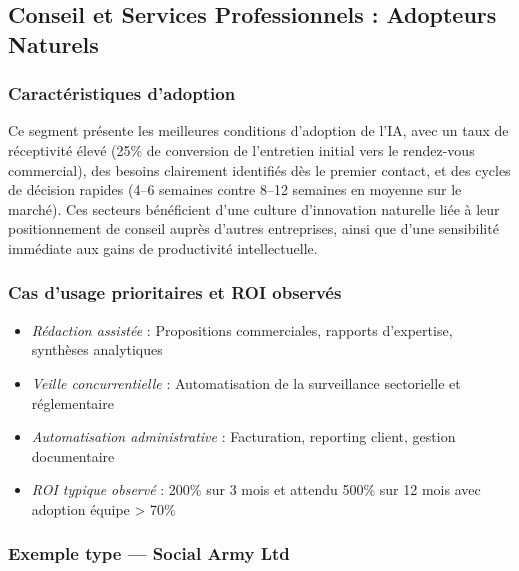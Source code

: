 \subsection{Conseil et Services Professionnels : Adopteurs Naturels}

\subsubsection{Caractéristiques d'adoption}
Ce segment présente les meilleures conditions d'adoption de l'IA, avec un taux de réceptivité élevé (25\% de conversion de l'entretien initial vers le rendez-vous commercial), des besoins clairement identifiés dès le premier contact, et des cycles de décision rapides (4--6 semaines contre 8--12 semaines en moyenne sur le marché). Ces secteurs bénéficient d'une culture d'innovation naturelle liée à leur positionnement de conseil auprès d'autres entreprises, ainsi que d'une sensibilité immédiate aux gains de productivité intellectuelle.

\subsubsection{Cas d'usage prioritaires et ROI observés}
\begin{itemize}
    \item \emph{Rédaction assistée} : Propositions commerciales, rapports d'expertise, synthèses analytiques
    \item \emph{Veille concurrentielle} : Automatisation de la surveillance sectorielle et réglementaire  
    \item \emph{Automatisation administrative} : Facturation, reporting client, gestion documentaire
    \item \emph{ROI typique observé} : 200\% sur 3 mois  et attendu 500\% sur 12 mois avec adoption équipe > 70\%
\end{itemize}

\subsubsection{Exemple type — Social Army Ltd}

